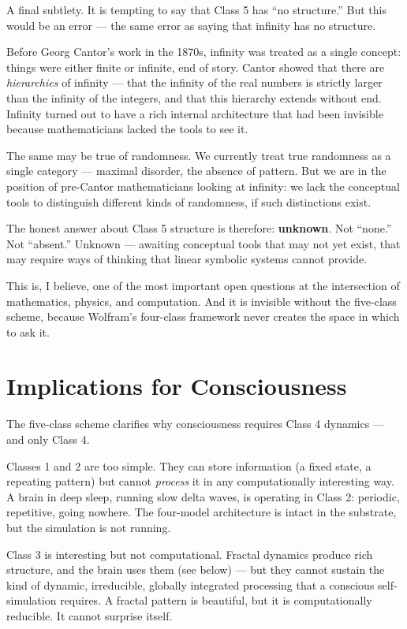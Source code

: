 \documentclass[11pt, twoside, openright]{book}
\begin{document}
A final subtlety. It is tempting to say that Class 5 has ``no structure.'' But this would be an error --- the same error as saying that infinity has no structure.

Before Georg Cantor's work in the 1870s, infinity was treated as a single concept: things were either finite or infinite, end of story. Cantor showed that there are \textit{hierarchies} of infinity --- that the infinity of the real numbers is strictly larger than the infinity of the integers, and that this hierarchy extends without end. Infinity turned out to have a rich internal architecture that had been invisible because mathematicians lacked the tools to see it.

The same may be true of randomness. We currently treat true randomness as a single category --- maximal disorder, the absence of pattern. But we are in the position of pre-Cantor mathematicians looking at infinity: we lack the conceptual tools to distinguish different kinds of randomness, if such distinctions exist.

The honest answer about Class 5 structure is therefore: \textbf{unknown}. Not ``none.'' Not ``absent.'' Unknown --- awaiting conceptual tools that may not yet exist, that may require ways of thinking that linear symbolic systems cannot provide.

This is, I believe, one of the most important open questions at the intersection of mathematics, physics, and computation. And it is invisible without the five-class scheme, because Wolfram's four-class framework never creates the space in which to ask it.

\section*{Implications for Consciousness}

The five-class scheme clarifies why consciousness requires Class 4 dynamics --- and only Class 4.

Classes 1 and 2 are too simple. They can store information (a fixed state, a repeating pattern) but cannot \textit{process} it in any computationally interesting way. A brain in deep sleep, running slow delta waves, is operating in Class 2: periodic, repetitive, going nowhere. The four-model architecture is intact in the substrate, but the simulation is not running.

Class 3 is interesting but not computational. Fractal dynamics produce rich structure, and the brain uses them (see below) --- but they cannot sustain the kind of dynamic, irreducible, globally integrated processing that a conscious self-simulation requires. A fractal pattern is beautiful, but it is computationally reducible. It cannot surprise itself.
\end{document}
